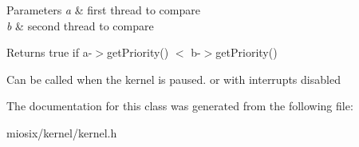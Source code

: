 \begin{DoxyParams}{Parameters}
{\em a} & first thread to compare \\
\hline
{\em b} & second thread to compare \\
\hline
\end{DoxyParams}
\begin{DoxyReturn}{Returns}
true if a-\/$>$get\-Priority() $<$ b-\/$>$get\-Priority()
\end{DoxyReturn}
Can be called when the kernel is paused. or with interrupts disabled 

The documentation for this class was generated from the following file\-:\begin{DoxyCompactItemize}
\item 
miosix/kernel/kernel.\-h\end{DoxyCompactItemize}

